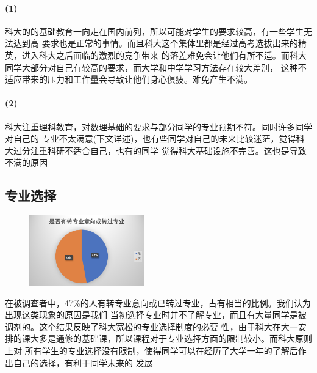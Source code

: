 \documentclass[UTF8]{ctexart}
\begin{document}
\paragraph{(1)}科大的的基础教育一向走在国内前列，所以可能对学生的要求较高，有一些学生无法达到高
要求也是正常的事情。而且科大这个集体里都是经过高考选拔出来的精英，进入科大之后面临的激烈的竞争带来
的落差难免会让他们有所不适。而科大同学大部分对自己有较高的要求，而大学和中学学习方法存在较大差别，
这种不适应带来的压力和工作量会导致让他们身心俱疲。难免产生不满。
\paragraph{(2)}科大注重理科教育，对数理基础的要求与部分同学的专业预期不符。同时许多同学对自己的
专业不太满意(下文详述)，也有些同学对自己的未来比较迷茫，觉得科大过分注重科研不适合自己，也有的同学
觉得科大基础设施不完善。这也是导致不满的原因

\subsection{专业选择}
\begin{figure}
\includegraphics[width=5cm]{chart/转专业.png}
\end{figure}
在被调查者中，47\%的人有转专业意向或已转过专业，占有相当的比例。我们认为出现这类现象的原因是我们
当初选择专业时并不了解专业，而且有大量同学是被调剂的。这个结果反映了科大宽松的专业选择制度的必要
性，由于科大在大一安排的课大多是通修的基础课，所以课程对于专业选择方面的限制较小。而科大原则上对
所有学生的专业选择没有限制，使得同学可以在经历了大学一年的了解后作出自己的选择，有利于同学未来的
发展
\end{document}
